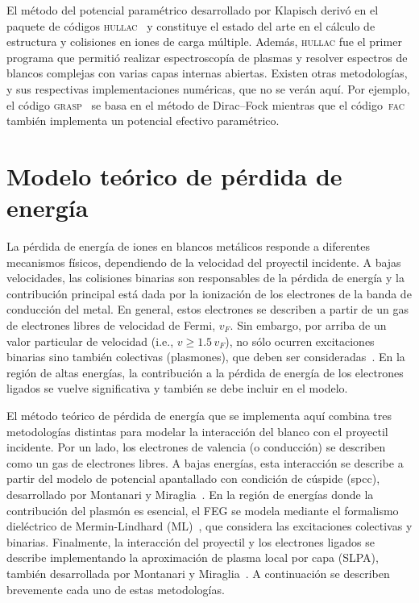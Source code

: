 El método del potencial paramétrico desarrollado por Klapisch derivó en
el paquete de códigos \textsc{hullac}~\cite{BarShalom:01} y constituye 
el estado del arte en el cálculo de estructura y colisiones en iones de 
carga múltiple. Además, \textsc{hullac} fue el primer programa que 
permitió realizar espectroscopía de plasmas y resolver espectros de 
blancos complejas con varias capas internas abiertas. Existen otras 
metodologías, y sus respectivas implementaciones numéricas, que no se 
verán aquí. Por ejemplo, el código \textsc{grasp}~\cite{Grant:80} se 
basa en el método de Dirac--Fock mientras que el 
código~\textsc{fac}~\cite{Gu:08} también implementa un potencial 
efectivo paramétrico.

\section{Modelo teórico de pérdida de energía}
\label{sec:method-stopping}

La pérdida de energía de iones en blancos metálicos responde a 
diferentes mecanismos físicos, dependiendo de la velocidad del proyectil 
incidente. A bajas velocidades, las colisiones binarias son responsables 
de la pérdida de energía y la contribución principal está dada por la 
ionización de los electrones de la banda de conducción del metal. En 
general, estos electrones se describen a partir de un gas de electrones 
libres de velocidad de Fermi, $v_F$. Sin embargo, por arriba de un valor 
particular de velocidad (i.e., $v\geq 1.5\,v_F$), no sólo ocurren 
excitaciones binarias sino también colectivas (plasmones), que deben ser
consideradas~\cite{Montanari:17}. En la región de altas energías, la 
contribución a la pérdida de energía de los electrones ligados se vuelve
significativa y también se debe incluir en el modelo.

El método teórico de pérdida de energía que se implementa aquí combina 
tres metodologías distintas para modelar la interacción del blanco con 
el proyectil incidente. Por un lado, los electrones de valencia (o 
conducción) se describen como un gas de electrones libres. A bajas 
energías, esta interacción se describe a partir del modelo de potencial
apantallado con condición de cúspide (\acs{spcc}), desarrollado por 
Montanari y Miraglia~\cite{Montanari:17}. En la región de energías donde 
la contribución del plasmón es esencial, el FEG se modela mediante el 
formalismo dieléctrico de Mermin-Lindhard (ML)~\cite{Mermin:70}, que 
considera las excitaciones colectivas y binarias. Finalmente, la 
interacción del proyectil y los electrones ligados se describe 
implementando la aproximación de plasma local por capa 
(SLPA), también desarrollada por Montanari y 
Miraglia~\cite{Montanari:17,Montanari:13}. A continuación se describen 
brevemente cada uno de estas metodologías. 

